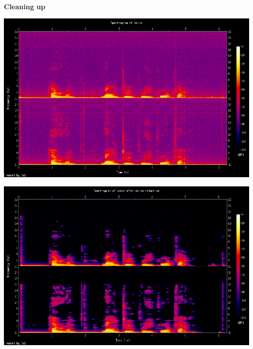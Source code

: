 \documentclass[usenames,dvipsnames, 18pt, compress, aspectratio=169]{beamer}
\begin{document}
\begin{frame}[fragile]{}
    \frametitle{}
    \begin{center}
        \textbf{Cleaning up}
        \vspace{0.2cm}

        \begin{minipage}{0.49\linewidth}
            \includegraphics[width=\linewidth]{voice-spectrogram.png}
        \end{minipage}
        \hfill
        \begin{minipage}{0.49\linewidth}
            \includegraphics[width=\linewidth]{voice-clean-spectrogram.png}
        \end{minipage}

    \end{center}
\end{frame}
\end{document}
